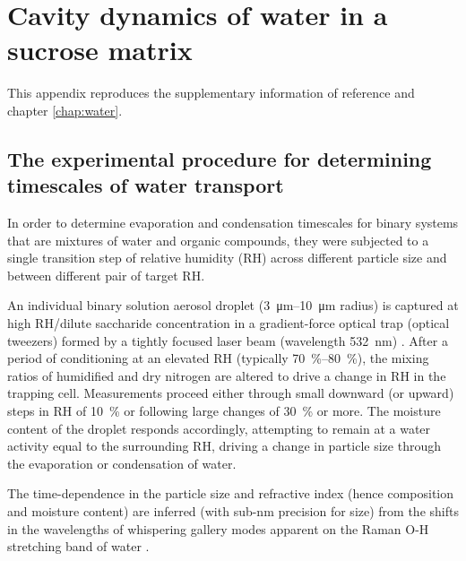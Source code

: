 %
%

\chapter{Cavity dynamics of water in a sucrose matrix}\label{app:wat}
This appendix reproduces the supplementary information of reference \cite{songTransientCavityDynamics2020a} and chapter \ref{chap:water}. 

\section{The experimental procedure for determining timescales of water transport}

In order to determine evaporation and condensation timescales for binary systems that are mixtures of water and organic compounds, they were subjected to a single transition step of relative humidity (RH) across different particle size and between different pair of target RH. 

An individual binary solution aerosol droplet (\SIrange[range-phrase=\text{--}]{3}{10}{\micro\meter} radius) is captured at high RH/dilute saccharide concentration in a gradient-force optical trap (optical tweezers) formed by a tightly focused laser beam (wavelength \SI{532}{\nano\meter}) \cite{powerProbingMicrorheologicalProperties2014, Song2016a}. After a period of conditioning at an elevated RH (typically \SIrange[range-phrase=\text{--}]{70}{80}{\percent}), the mixing ratios of humidified and dry nitrogen are altered to drive a change in RH in the trapping cell. Measurements proceed either through small downward (or upward) steps in RH of \SI{10}{\percent} or following large changes of \SI{30}{\percent} or more. The moisture content of the droplet responds accordingly, attempting to remain at a water activity equal to the surrounding RH, driving a change in particle size through the evaporation or condensation of water. 

The time-dependence in the particle size and refractive index (hence composition and moisture content) are inferred (with sub-\si{\nano\meter} precision for size) from the shifts in the wavelengths of whispering gallery modes apparent on the Raman O-H stretching band of water \cite{prestonAccurateEfficientDetermination2013,reidSpectroscopicStudiesSize2007,reidLaserProbingSingleaerosol2006}.

